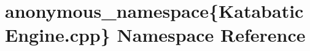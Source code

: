 \hypertarget{namespaceanonymous__namespace_02KatabaticEngine_8cpp_03}{}\section{anonymous\+\_\+namespace\{Katabatic\+Engine.\+cpp\} Namespace Reference}
\label{namespaceanonymous__namespace_02KatabaticEngine_8cpp_03}
